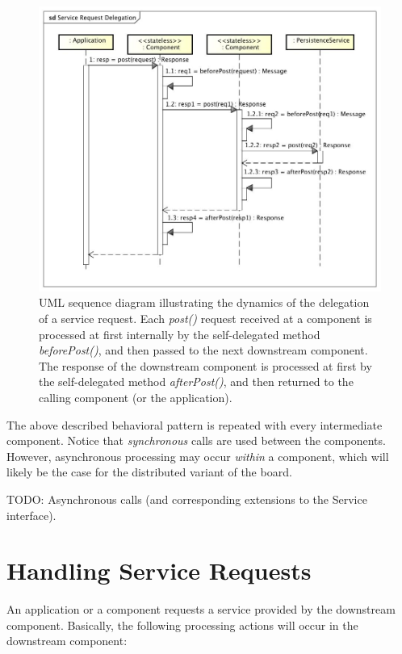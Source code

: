 \documentclass[oneside]{scrreprt}
\begin{document}
\begin{figure}[ht]
\centerline{
\includegraphics[width=1.0\textwidth]{figs/service-request-delegation}}
\caption{UML sequence diagram illustrating the dynamics of the
delegation of a service request. Each \emph{post()} request received
at a component is processed at first internally by the
self-delegated method \emph{beforePost()}, and then passed to
the next downstream component. The response of the downstream
component is processed at first by the self-delegated
method \emph{afterPost()}, and then returned to the calling
component (or the application).}
\label{fig:service-request-delegation}
\end{figure}

The above described behavioral pattern is repeated with
every intermediate component. Notice that \emph{synchronous} calls
are used between the components.
However, asynchronous processing may occur \emph{within}
a component, which will likely be the case for the
distributed variant of the board.

TODO: Asynchronous calls
(and corresponding extensions to the Service interface).


\section{Handling Service Requests}

An application or a component requests a service provided by
the downstream component. Basically, the following
processing actions will occur in the downstream component:
\end{document}
